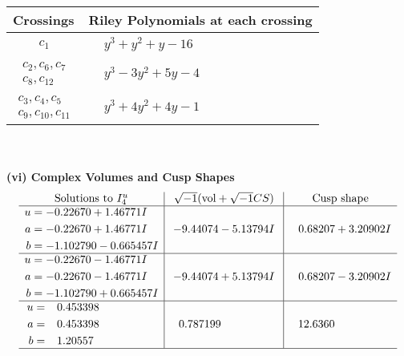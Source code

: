 \documentclass[1p]{elsarticle_modified}
\theoremstyle{definition}
\newcommand{\I}{\sqrt{-1}}
\begin{document}
\begin{tabular}{m{50pt}|m{274pt}}
Crossings & \hspace{64pt}Riley Polynomials at each crossing \\
\hline $$\begin{aligned}c_{1}\end{aligned}$$&$\begin{aligned}
&y^3+y^2+y-16
\end{aligned}$\\
\hline $$\begin{aligned}c_{2},c_{6},c_{7}\\c_{8},c_{12}\end{aligned}$$&$\begin{aligned}
&y^3-3 y^2+5 y-4
\end{aligned}$\\
\hline $$\begin{aligned}c_{3},c_{4},c_{5}\\c_{9},c_{10},c_{11}\end{aligned}$$&$\begin{aligned}
&y^3+4 y^2+4 y-1
\end{aligned}$\\
\hline
\end{tabular}\\~\\
\newpage\flushleft \textbf{(vi) Complex Volumes and Cusp Shapes}
$$\begin{array}{c|c|c}  
\text{Solutions to }I^u_{4}& \I (\text{vol} + \sqrt{-1}CS) & \text{Cusp shape}\\
 \hline 
\begin{aligned}
u &= -0.22670 + 1.46771 I \\
a &= -0.22670 + 1.46771 I \\
b &= -1.102790 - 0.665457 I\end{aligned}
 & -9.44074 - 5.13794 I & \phantom{-}0.68207 + 3.20902 I \\ \hline\begin{aligned}
u &= -0.22670 - 1.46771 I \\
a &= -0.22670 - 1.46771 I \\
b &= -1.102790 + 0.665457 I\end{aligned}
 & -9.44074 + 5.13794 I & \phantom{-}0.68207 - 3.20902 I \\ \hline\begin{aligned}
u &= \phantom{-}0.453398\phantom{ +0.000000I} \\
a &= \phantom{-}0.453398\phantom{ +0.000000I} \\
b &= \phantom{-}1.20557\phantom{ +0.000000I}\end{aligned}
 & \phantom{-}0.787199\phantom{ +0.000000I} & \phantom{-}12.6360\phantom{ +0.000000I}\\
 \hline 
 \end{array}$$\newpage\newpage\renewcommand{\arraystretch}{1}
\end{document}
